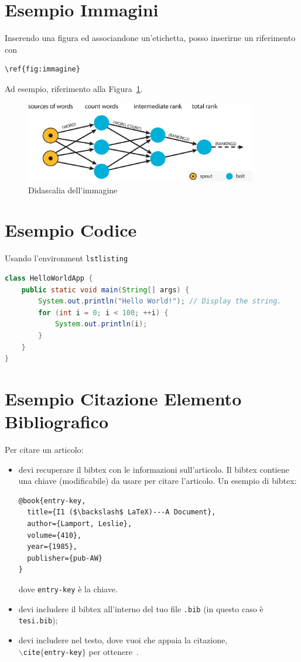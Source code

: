 \section{Esempio Immagini}
Inserendo una figura ed associandone un'etichetta, posso inserirne un riferimento con 
\begin{lstlisting}
\ref{fig:immagine}
\end{lstlisting}

Ad esempio, riferimento alla Figura~\ref{fig:immagine}.

\begin{figure}
\centering
\includegraphics[width=0.9\textwidth]{immagini/example-of-application.eps}
\caption{Didascalia dell'immagine}\label{fig:immagine}
\end{figure}


\section{Esempio Codice}
Usando l'environment \texttt{lstlisting}

\begin{lstlisting}[language=java]
class HelloWorldApp {
    public static void main(String[] args) {
        System.out.println("Hello World!"); // Display the string.
        for (int i = 0; i < 100; ++i) {
            System.out.println(i);
        }
    }
}
\end{lstlisting}


\section{Esempio Citazione Elemento Bibliografico}
Per citare un articolo:
\begin{itemize}
\item devi recuperare il bibtex con le informazioni sull'articolo. Il bibtex contiene una chiave (modificabile) da usare per citare l'articolo. Un esempio di bibtex:
\begin{lstlisting}
@book{entry-key,
  title={I1 ($\backslash$ LaTeX)---A Document},
  author={Lamport, Leslie},
  volume={410},
  year={1985},
  publisher={pub-AW}
}
\end{lstlisting}
dove \texttt{entry-key} è la chiave.

\item devi includere il bibtex all'interno del tuo file \texttt{.bib} (in questo caso è \texttt{tesi.bib});

\item devi includere nel testo, dove vuoi che appaia la citazione,\\ \texttt{$\backslash$cite$\lbrace$entry-key$\rbrace$} per ottenere~\cite{entry-key}.

\end{itemize}